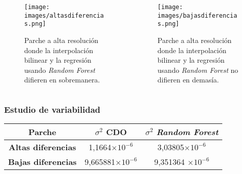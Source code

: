 \documentclass{beamer}
\begin{document}
  \begin{frame}
    \begin{columns}

      \begin{column}{0.5\textwidth}
        \begin{figure}
          \centering
          \texttt{[image: images/altasdiferencias.png]}
          \caption{Parche a alta resolución donde la interpolación bilinear y la regresión usando \textit{Random Forest} difieren en sobremanera.}
        \end{figure}
      \end{column}

      \begin{column}{0.5\textwidth}
        \begin{figure}
          \centering
          \texttt{[image: images/bajasdiferencias.png]}
          \caption{Parche a alta resolución donde la interpolación bilinear y la regresión usando \textit{Random Forest} no difieren en demasía.}
        \end{figure}
      \end{column}

    \end{columns}
  \end{frame}

  \begin{frame}
    \frametitle{Estudio de variabilidad}

    \begin{center}
      \begin{tabular}{|c|c|c|}
        \hline
        \textbf{Parche}	& \textbf{$\sigma^2$ CDO}	& \textbf{$\sigma^2$ \textit{Random Forest}} \\
        \hline
        \textbf{Altas diferencias}		& 1,1664$\times 10^{-6}$ &3,03805$\times 10^{-6}$  \\
        \textbf{Bajas diferencias}		 & 9,665881$\times 10^{-6}$ & 9,351364 $\times 10^{-6}$\\
        \hline
      \end{tabular}
    \end{center}
  \end{frame}
\end{document}
